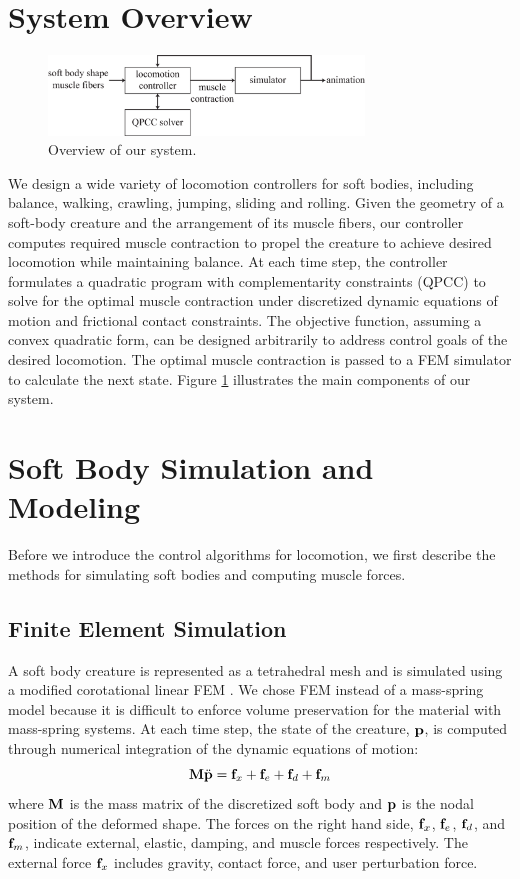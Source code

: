\section{System Overview}

\begin{figure}[ht]
  \centering
  \includegraphics[width=3.3in]{figures/overview3}
  \caption{Overview of our system.}
  \label{fig:overview}
\end{figure}

We design a wide variety of locomotion controllers for soft bodies,
including balance, walking, crawling, jumping, sliding and rolling.
Given the geometry of a soft-body creature and the
arrangement of its muscle fibers, our controller computes required
muscle contraction to propel the creature to achieve desired
locomotion while maintaining balance. At each time step, the
controller formulates a quadratic program with complementarity
constraints (QPCC) to solve for the optimal muscle contraction under
discretized dynamic equations of motion and frictional contact
constraints. The objective function, assuming a convex quadratic form,
can be designed arbitrarily to address control goals of the desired
locomotion. The optimal muscle contraction is passed to a FEM
simulator to calculate the next state. Figure \ref{fig:overview}
illustrates the main components of our system.

\section{Soft Body Simulation and Modeling}
Before we introduce the control algorithms for locomotion, we first
describe the methods for simulating soft bodies and computing muscle
forces.

\subsection{Finite Element Simulation}
A soft body creature is represented as a tetrahedral mesh and
is simulated using a modified corotational linear FEM
\cite{Muller:2002}. We chose FEM instead of a mass-spring model
because it is difficult to enforce volume preservation for the material with mass-spring systems.
At each time step, the state of the creature,
$\mathbf{p}$, is computed through numerical integration of the dynamic
equations of motion:
\begin{equation}
\mathbf{M}\ddot{\mathbf{p}} = \mathbf{f}_{x} + \mathbf{f}_{e}+\mathbf{f}_{d}+\mathbf{f}_{m}
\label{eq:dynamics}
\end{equation}
where $\mathbf{M}$ is the mass matrix of the discretized soft body and
$\mathbf{p}$ is the nodal position of the deformed shape. The forces on
the right hand side, $\mathbf{f}_{x}$, $\mathbf{f}_{e}$, $\mathbf{f}_{d}$, and
$\mathbf{f}_{m}$, indicate external, elastic, damping, and muscle forces
respectively. The external force $\mathbf{f}_{x}$ includes gravity,
contact force, and user perturbation force.

